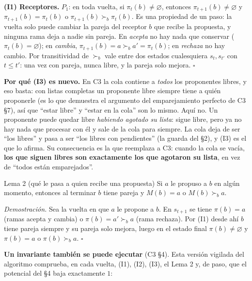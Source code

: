 \documentclass[11pt]{article}
\begin{document}
\textbf{(I1) Receptores.} $P_1$: en toda vuelta, si $\pi_t(b)\ne\varnothing$, entonces $\pi_{t+1}(b)\ne\varnothing$ y
$\pi_{t+1}(b)=\pi_t(b)$ o $\pi_{t+1}(b)\succ_b\pi_t(b)$. Es una propiedad de un paso: la vuelta solo puede cambiar la
pareja del receptor $b$ que recibe la propuesta, y ninguna rama deja a nadie sin pareja. En \emph{acepta} no hay
nada que conservar ($\pi_t(b)=\varnothing$); en \emph{cambia}, $\pi_{t+1}(b)=a\succ_b a'=\pi_t(b)$; en \emph{rechaza}
no hay cambio. Por transitividad de $\succ_b$ vale entre dos estados cualesquiera $s_t,s_{t'}$ con $t\le t'$: una vez con
pareja, nunca libre, y la pareja solo mejora. $\square$

\textbf{Por qué (I3) es nuevo.} En C3 la cola contiene a \emph{todos} los proponentes libres, y eso basta:
con listas completas un proponente libre siempre tiene a quién proponerle (es lo que demuestra el argumento del
emparejamiento perfecto de C3 §7), así que ``estar libre'' y ``estar en la cola'' son lo mismo. Aquí no.
Un proponente puede quedar libre \emph{habiendo agotado su lista}: sigue libre, pero ya no hay nada que
procesar con él y sale de la cola para siempre. La cola deja de ser ``los libres'' y pasa a ser ``los libres con
pendientes'' (la guarda del §2), y (I3) es el que lo afirma. Su consecuencia es la que reemplaza a C3: cuando la
cola se vacía, \textbf{los que siguen libres son exactamente los que agotaron su lista}, en vez de ``todos
están emparejados''.

\begin{resultado}{Lema 2 (qué le pasa a quien recibe una propuesta)}
Si $a$ le propuso a $b$ en algún momento, entonces al terminar $b$ tiene pareja y $M(b)=a$ o $M(b)\succ_ba$.
\end{resultado}

\textit{Demostración.} Sea la vuelta en que $a$ le propone a $b$. En $s_{t+1}$ se tiene $\pi(b)=a$ (ramas acepta y
cambia) o $\pi(b)=a'\succ_ba$ (rama rechaza). Por (I1) desde ahí $b$ tiene pareja siempre y su pareja solo mejora,
luego en el estado final $\pi(b)\ne\varnothing$ y $\pi(b)=a$ o $\pi(b)\succ_ba$. $\square$

\noindent\begin{minipage}{\linewidth}
\textbf{Un invariante también se puede ejecutar} (C3 §4). Esta versión vigilada del algoritmo comprueba, en
cada vuelta, (I1), (I2), (I3), el Lema 2 y, de paso, que el potencial del §4 baja exactamente $1$:


\end{minipage}
\end{document}
